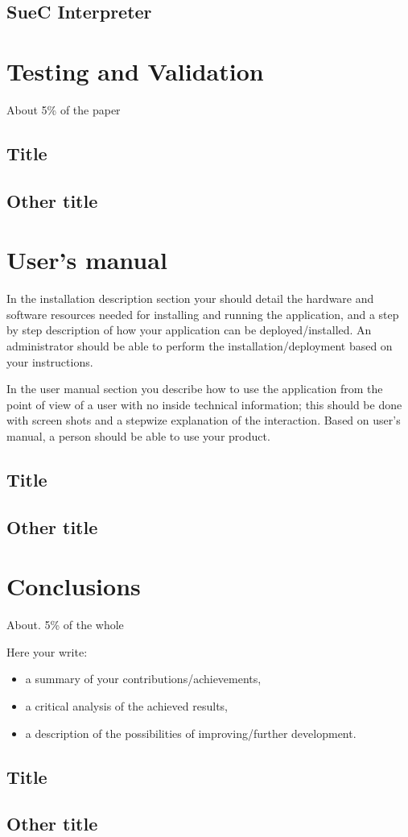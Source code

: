 \documentclass[12pt,a4paper,twoside]{report}
\begin{document}
\section{SueC Interpreter}

\chapter{Testing and Validation}

About 5\% of the paper
\section{Title}
\section{Other title}

\chapter{User's manual}

In the installation description section your should detail the hardware and software resources needed for installing and running the application, and a step by step description of how your application can be deployed/installed. An administrator should be able to perform the installation/deployment based on your instructions.

In the user manual section you describe how to use the application from the point of view of a user with no inside technical information; this should be done with screen shots and a stepwize explanation of the interaction. Based on user's manual, a person should be able to use your product.

\section{Title}
\section{Other title}

\chapter{Conclusions}

About. 5\% of the whole

Here your write:
\begin{itemize}
\item a summary of your contributions/achievements,
\item a critical analysis of the achieved results,
\item a description of the possibilities of improving/further development.
\end{itemize}
\section{Title}
\section{Other title}


 


\end{document}
